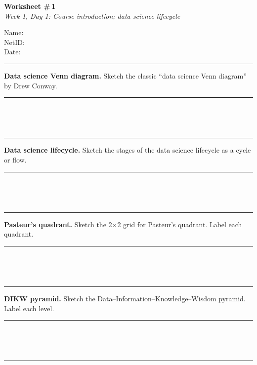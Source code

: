 \documentclass[11pt]{article}
\newcommand{\workspace}[1]{%
  \vspace{0.3em}
  \noindent\rule{\linewidth}{0.4pt}\\[-0.3em]
  \begin{minipage}[t][#1][t]{\linewidth}
  \end{minipage}\\
  \noindent\rule{\linewidth}{0.4pt}
  \vspace{0.3em}
}
\begin{document}
\noindent
\begin{minipage}[t]{0.55\textwidth}
  \vspace{0pt}
  {\LARGE \textbf{Worksheet \#\,1}} \\[0.3em]
  {\large \textit{Week 1, Day 1: Course introduction; data science lifecycle}}
\end{minipage}
\hfill
\begin{minipage}[t]{0.40\textwidth}
  \vspace{0pt}
  \begin{mdframed}[linecolor=black, linewidth=1pt, innertopmargin=10pt, innerbottommargin=10pt]
    \small
    \vspace{0.4cm}
    Name: \underline{\hspace{4.5cm}} \\[1em]
    NetID: \underline{\hspace{4.3cm}} \\[1em]
    Date: \underline{\hspace{4.4cm}} \\
  \end{mdframed}
\end{minipage}

\vspace{1em}
\noindent\rule{\linewidth}{1pt}
\vspace{0.2em}

\noindent\textbf{Data science Venn diagram.} Sketch the classic ``data
science Venn diagram'' by Drew Conway.

\workspace{6cm}

\noindent\textbf{Data science lifecycle.} Sketch the stages of the data
science lifecycle as a cycle or flow.

\workspace{6cm}

\newpage

\noindent\textbf{Pasteur's quadrant.} Sketch the 2$\times$2 grid for
Pasteur's quadrant. Label each quadrant.

\workspace{6cm}

\noindent\textbf{DIKW pyramid.} Sketch the Data--Information--Knowledge--Wisdom
pyramid. Label each level.

\workspace{6cm}

\vfill
\end{document}
